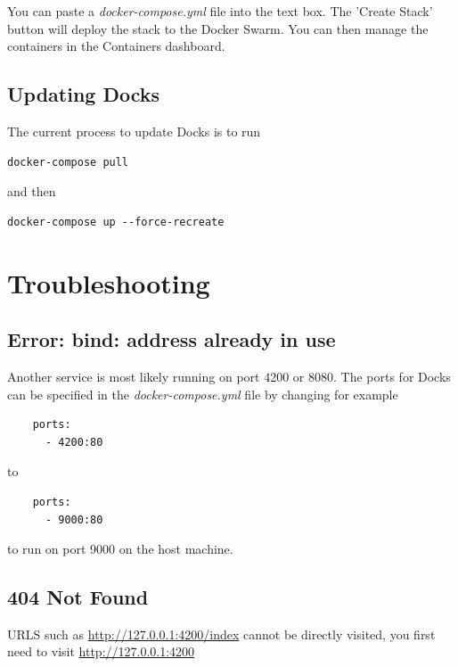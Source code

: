 \documentclass[]{article}
\begin{document}
You can paste a \emph{docker-compose.yml} file into the text box. The 'Create Stack' button will deploy the stack to the Docker Swarm. You can then manage the containers in the Containers dashboard.

\subsection{Updating Docks}
The current process to update Docks is to run

\begin{lstlisting}
docker-compose pull
\end{lstlisting}

and then

\begin{lstlisting}
docker-compose up --force-recreate
\end{lstlisting}

\section{Troubleshooting}
\subsection{Error: bind: address already in use}
Another service is most likely running on port 4200 or 8080. The ports for Docks
can be specified in the \emph{docker-compose.yml} file by changing for example

\begin{lstlisting}
    ports:
      - 4200:80
\end{lstlisting}
to
\begin{lstlisting}
    ports:
      - 9000:80
\end{lstlisting}
to run on port 9000 on the host machine.

\subsection{404 Not Found}
URLS such as \url{http://127.0.0.1:4200/index} cannot be directly visited, you first need to visit \url{http://127.0.0.1:4200}
\end{document}
